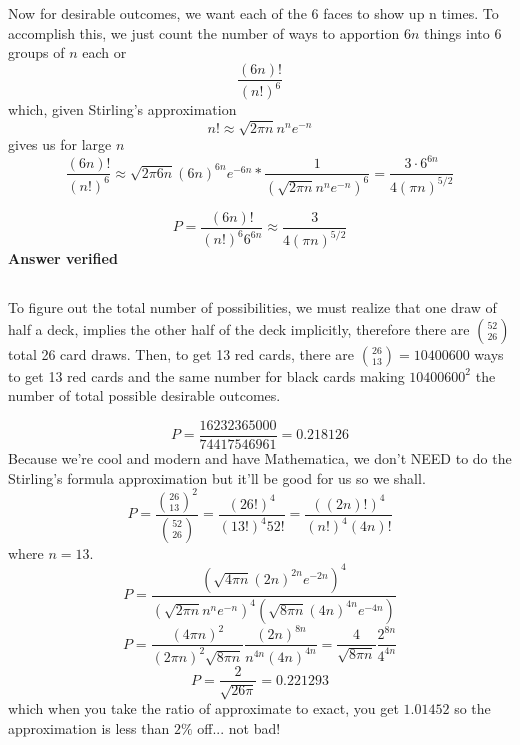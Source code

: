 Now for desirable outcomes, we want each of the 6 faces to show up n times.  To accomplish this, we just count the number of ways to apportion $6n$ things into 6 groups of $n$ each or
\begin{equation}
	\frac{(6n)!}{(n!)^6}
\end{equation}
which, given Stirling's approximation
\begin{equation}
	n! \approx \sqrt{2 \pi n} n^n e^{-n}
\end{equation}
gives us for large $n$
\begin{equation}
	\frac{(6n)!}{(n!)^6} \approx \sqrt{2 \pi 6n} (6n)^{6n} e^{-6n} * \frac{1}{(\sqrt{2 \pi n} n^n e^{-n})^6} = \frac{3 \cdot 6^{6n}}{4 (\pi n)^{5/2}}
\end{equation}

\begin{equation}
	P=\frac{(6n)!}{(n!)^6 6^{6n}} \approx \frac{3}{4 (\pi n)^{5/2}}
\label{answer1.13}
\end{equation}
\textbf{Answer verified}



\subsection{}
To figure out the total number of possibilities, we must realize that one draw of half a deck, implies the other half of the deck implicitly, therefore there are $\binom{52}{26}$ total 26 card draws.  Then, to get 13 red cards, there are $\binom{26}{13} = 10400600$ ways to get 13 red cards and the same number for black cards making $10400600^2$ the number of total possible desirable outcomes.

\begin{equation}
	P=\frac{16232365000}{74417546961}=0.218126
\label{answer1.14}
\end{equation}
Because we're cool and modern and have Mathematica, we don't NEED to do the Stirling's formula approximation but it'll be good for us so we shall.
\begin{equation}
	P=\frac{\binom{26}{13}^2}{\binom{52}{26}} = \frac{(26!)^4}{(13!)^4 52!}=\frac{((2n)!)^4}{(n!)^4 (4n)!}
\end{equation}
where $n=13$.
\begin{equation}
	P=\frac{(\sqrt{4 \pi n}(2n)^{2n}e^{-2n})^4}{(\sqrt{2 \pi n}n^{n}e^{-n})^4 (\sqrt{8 \pi n}(4n)^{4n}e^{-4n})}
\end{equation}
\begin{equation}
	P=\frac{(4 \pi n)^2}{(2 \pi n)^2 \sqrt{8 \pi n}} \frac{(2n)^{8n}}{n^{4n}(4n)^{4n}} = \frac{4}{\sqrt{8 \pi n}} \frac{2^{8n}}{4^{4n}}
\end{equation}
\begin{equation}
	P=\frac{2}{\sqrt{26 \pi}} = 0.221293
\end{equation}
which when you take the ratio of approximate to exact, you get $1.01452$ so the approximation is less than $2\%$ off... not bad!

